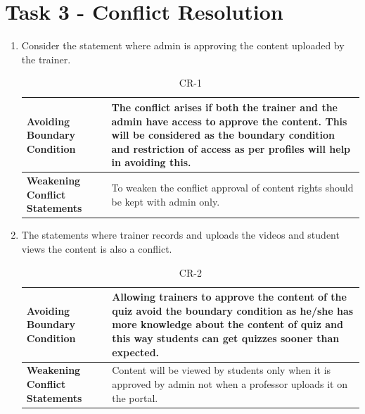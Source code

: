 \documentclass{report}
\begin{document}
\section{Task 3 - Conflict Resolution}
\begin{enumerate}
    \item Consider the statement where admin is approving the content uploaded by the trainer.\\[0.3cm]
    \begin{table}[htb!]
        \centering
    \begin{tabular}{|p{3.5cm}|p{8.5cm}|} \hline
        \textbf{Avoiding Boundary Condition} & The conflict arises if both the trainer and the admin have access to approve the content. This will be considered as the boundary condition and restriction of access as per profiles will help in avoiding this.  \\ \hline
        \textbf{Weakening Conflict Statements} & To weaken the conflict approval of content rights should be kept with admin only.\\ \hline
    \end{tabular}
    \caption{CR-1}
        \label{tab:my_label}
    \end{table}
    \item The statements where trainer records and uploads the videos and student views the content is also a conflict.\\[0.3cm]
    \begin{table}[htb!]
    \centering
    \begin{tabular}{|p{3.5cm}|p{8.5cm}|} \hline
        \textbf{Avoiding Boundary Condition} & Allowing trainers to approve the content of the quiz avoid the boundary condition as he/she has more knowledge about the content of quiz and this way students can get quizzes sooner than expected.  \\ \hline
        \textbf{Weakening Conflict Statements} & Content will be viewed by students only when it is approved by admin not when a professor uploads it on the portal.\\ \hline
    \end{tabular}
    \caption{CR-2}
        \label{tab:my_label}
    \end{table}
\end{enumerate}
\end{document}
